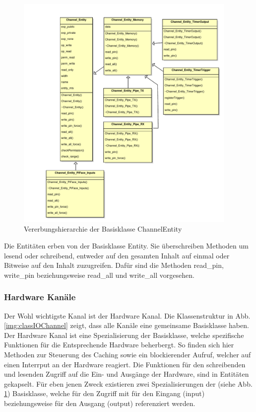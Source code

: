 \begin{figure}[H]
	\begin{center}
		\includegraphics[width=0.95\textwidth ,clip]{./code/ChannelEntity.pdf}
		\caption{Vererbungshierarchie der Basisklasse ChannelEntity}
		\label{img:classChannelEntity}
	\end{center} 
\end{figure}	

Die Entitäten erben von der Basisklasse Entity. Sie überschreiben Methoden um lesend oder schreibend, entweder auf den gesamten Inhalt auf einmal oder Bitweise auf den Inhalt zuzugreifen. Dafür sind die Methoden read\_pin, write\_pin beziehungsweise read\_all und write\_all vorgesehen. 



\subsubsection{Hardware Kanäle}\label{kap:ums:hwchannels}
Der Wohl wichtigste Kanal ist der Hardware Kanal. Die Klassenstruktur in Abb. \ref{img:classIOChannel} zeigt, dass alle Kanäle eine gemeinsame Basisklasse haben. Der Hardware Kanal ist eine Spezialisierung der Basisklasse, welche spezifische Funktionen für die Entsprechende Hardware beherbergt. So finden sich hier Methoden zur Steuerung des Caching sowie ein blockierender Aufruf, welcher auf einen Interrput an der Hardware reagiert. Die Funktionen für den schreibenden und lesenden Zugriff auf die Ein- und Ausgänge der Hardware, sind in Entitäten gekapselt. Für eben jenen Zweck existieren zwei Spezialisierungen der  (siehe Abb. \ref{img:classChannelEntity}) Basisklasse, welche für den Zugriff mit  für den Eingang (input) beziehungsweise  für den Ausgang (output) referenziert werden.   

